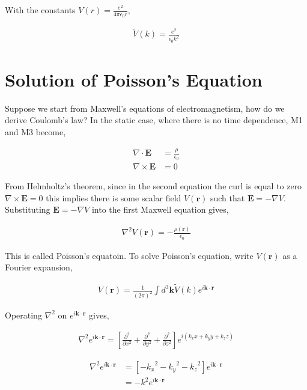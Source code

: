 \documentclass[11pt]{amsart}
\begin{document}
With the constants $V(r) = \frac{e^2}{4\pi\epsilon_0 r}$,

\begin{align*}
  \tilde{V}(k) = \frac{e^2}{\epsilon_0 k^2}
\end{align*}


\section{Solution of Poisson's Equation}

Suppose we start from Maxwell's equations of electromagnetism, how do we derive Coulomb's law? In the static case, where there is no time dependence, M1 and M3 become,

\begin{align*}
  \nabla\cdot\mathbf{E} &= \frac{\rho}{\epsilon_0} \\
  \nabla\times\mathbf{E} &= 0
\end{align*}

From Helmholtz's theorem, since in the second equation the curl is equal to zero $\nabla\times\mathbf{E} = 0$ this implies there is some scalar field $V(\mathbf{r})$ such that $\mathbf{E} = -\nabla V$. Substituting $\mathbf{E} = -\nabla V$ into the first Maxwell equation gives,

\begin{align*}
  \nabla^2 V(\mathbf{r}) = -\frac{\rho(\mathbf{r})}{\epsilon_0}
\end{align*}

This is called Poisson's equatoin. To solve Poisson's equation, write $V(\mathbf{r})$ as a Fourier expansion,

\begin{align*}
  V(\mathbf{r}) = \frac{1}{{(2\pi)}^2}\int d^3\mathbf{k} \tilde{V}(k) e^{i\mathbf{k}\cdot\mathbf{r}}
\end{align*}

Operating $\nabla^2$ on $e^{i\mathbf{k}\cdot\mathbf{r}}$ gives,

\begin{align*}
  \nabla^2 e^{i\mathbf{k}\cdot\mathbf{r}} = \left[\frac{\partial^2}{\partial x^2} + \frac{\partial^2}{\partial y^2} + \frac{\partial^2}{\partial z^2}\right] e^{i(k_x x + k_y y + k_z z)}
\end{align*}

\begin{align*}
  \nabla^2 e^{i\mathbf{k}\cdot\mathbf{r}} &= \left[-{k_x}^2 -{k_y}^2 -{k_z}^2\right] e^{i\mathbf{k}\cdot\mathbf{r}} \\
                                           &= -k^2 e^{i\mathbf{k}\cdot\mathbf{r}}
\end{align*}
\end{document}
